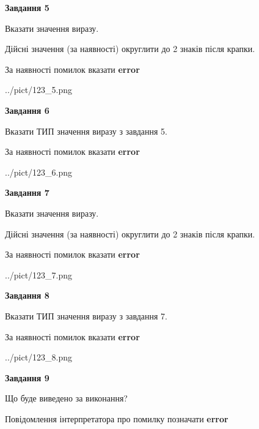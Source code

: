 \documentclass[11pt, ukrainian]{article}
\begin{document}
{\begin {large}
{\begin {center}\textbf{Завдання 5}\end {center}}\par
Вказати значення виразу. \par
Дійсні значення (за наявності) округлити до 2 знаків після крапки. \par
За наявності помилок вказати \textbf{error}

\begin{center}
	{../pict/123_5.png}
\end{center}
\newpage

{\begin {center}\textbf{Завдання 6}\end {center}}\par
Вказати ТИП значення виразу з завдання 5. \par
За наявності помилок вказати \textbf{error}

\begin{center}
	{../pict/123_6.png}
\end{center}
\newpage

{\begin {center}\textbf{Завдання 7}\end {center}}\par
Вказати значення виразу. \par
Дійсні значення (за наявності) округлити до 2 знаків після крапки. \par
За наявності помилок вказати \textbf{error}

\begin{center}
	{../pict/123_7.png}
\end{center}
\newpage

{\begin {center}\textbf{Завдання 8}\end {center}}\par
Вказати ТИП значення виразу з завдання 7. \par
За наявності помилок вказати \textbf{error}

\begin{center}
	{../pict/123_8.png}
\end{center}
\newpage

{\begin {center}\textbf{Завдання 9}\end {center}}\par
Що буде виведено за виконання? \par
Повідомлення інтерпретатора про помилку позначати \textbf{error}


\end{large}}
\end{document}
